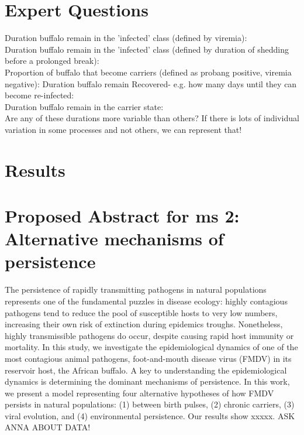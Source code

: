 \documentclass{article}
\begin{document}
\section{Expert Questions}
Duration buffalo remain in the 'infected' class (defined by viremia): \\
Duration buffalo remain in the 'infected' class (defined by duration of shedding before a prolonged break): \\
Proportion of buffalo that become carriers (defined as probang positive, viremia negative):
Duration buffalo remain Recovered- e.g. how many days until they can become re-infected:  \\
Duration buffalo remain in the carrier state: \\
Are any of these durations more variable than others?  
If there is lots of individual variation in some processes and not others, we can represent that!


\section{Results}

\section *{Proposed Abstract for ms 2: Alternative mechanisms of persistence}

The persistence of rapidly transmitting pathogens in natural populations represents one of the fundamental puzzles in disease ecology: highly contagious pathogens tend to reduce the pool of susceptible hosts to very low numbers, increasing their own risk of extinction during epidemics troughs. 
Nonetheless, highly transmissible pathogens do occur, despite causing rapid host immunity or mortality.  
In this study, we investigate the epidemiological dynamics of one of the most contagious animal pathogens, foot-and-mouth disease virus (FMDV) in its reservoir host, the African buffalo.  
A key to understanding the epidemiological dynamics is determining the dominant mechanisms of persistence.  
In this work, we present a model representing four alternative hypotheses of how FMDV persists in natural populations: (1) between birth pulses, (2) chronic carriers, (3) viral evolution, and (4) environmental persistence. 
Our results show xxxxx. 
ASK ANNA ABOUT DATA! %

\end{document}

